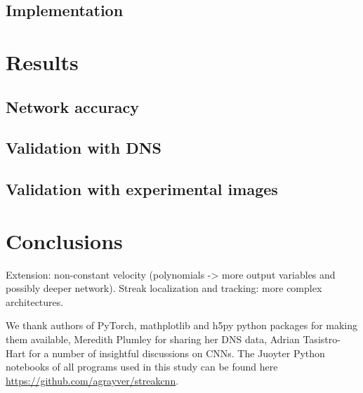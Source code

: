 \documentclass{svjour3}                     %
\begin{document}
\subsection{Implementation}

\section{Results}

\subsection{Network accuracy}

\subsection{Validation with DNS}

\subsection{Validation with experimental images}

\section{Conclusions}

Extension: non-constant velocity (polynomials -> more output variables and possibly deeper network).
Streak localization and tracking: more complex architectures.



\begin{acknowledgements}
We thank authors of PyTorch, mathplotlib and h5py python packages for making them available, Meredith Plumley for sharing her DNS data, Adrian Tasistro-Hart for a number of insightful discussions on CNNs. The Juoyter Python notebooks of all programs used in this study can be found here \url{https://github.com/agrayver/streakcnn}.
\end{acknowledgements}





\end{document}
